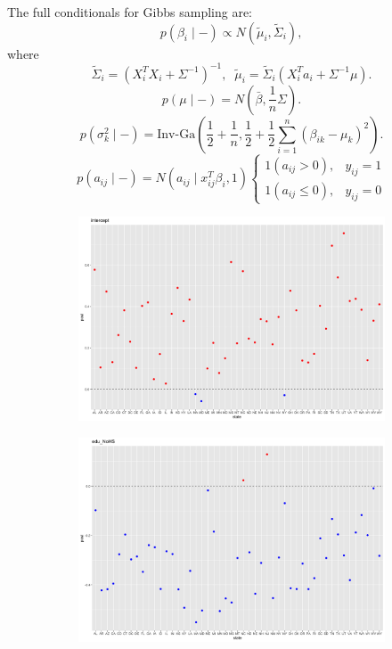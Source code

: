 \documentclass[11pt]{article}
\begin{document}
The full conditionals for Gibbs sampling are:
$$p(\beta_i \mid - ) \propto N(\tilde{\mu}_i, \tilde{\Sigma}_i),$$
where
$$\tilde{\Sigma}_i = (X_i^TX_i + \Sigma^{-1})^{-1}, \;\; \tilde{\mu}_i = \tilde{\Sigma}_i (X_i^Ta_i + \Sigma^{-1}\mu).$$
$$p(\mu \mid -) = N(\bar{\beta}, \frac{1}{n} \Sigma).$$
$$p(\sigma_k^2 \mid -) = \text{Inv-Ga}(\frac{1}2 + \frac{1}n, \frac{1}2 + \frac{1}2 \sum_{i=1}^n (\beta_{ik} - \mu_k)^2 ).$$
$$p(a_{ij} \mid -) = N(a_{ij} \mid x_{ij}^T\beta_i, 1) 
\begin{cases}
1(a_{ij} >0), & y_{ij}=1 \\
1(a_{ij} \leq 0), & y_{ij}=0 
\end{cases}$$

\begin{figure}
    \centering
    \begin{subfigure}[t]{0.9\textwidth}
        \centering
        \includegraphics[width=\linewidth]{Ex5/figures/2post covariates1.png} 
    \end{subfigure}
    \hfill
    \begin{subfigure}[t]{0.9\textwidth}
        \centering
        \includegraphics[width=\linewidth]{Ex5/figures/2post covariates2.png} 
    \end{subfigure}
\end{figure}
\end{document}
